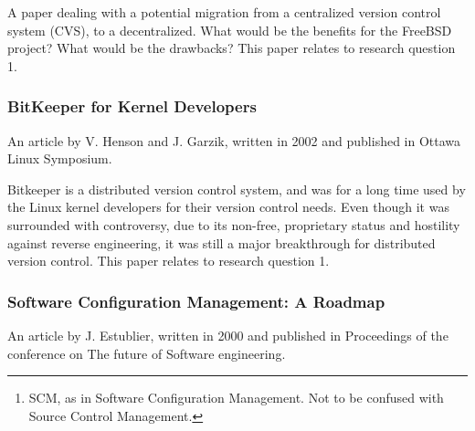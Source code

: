 \documentclass{llncs}
\begin{document}
A paper dealing with a potential migration from a centralized version
control system (CVS), to a decentralized. What would be the benefits
for the FreeBSD project? What would be the drawbacks? This paper
relates to research question 1.

\subsubsection{BitKeeper for Kernel Developers}

An article by V. Henson and J. Garzik, written in 2002 and published in
Ottawa Linux Symposium.

\begin{abstract}
 BitKeeper is a revolutionary new distributed source control management
 suite which is ideal for Linux kernel development. BitKeeper provides tools
 which automate and simplify many common kernel development tasks. In this
 paper, we describe basic BitKeeper concepts and operations, BitKeeper
 solutions for common kernel development problems, and a workflow for
 interacting with other Linux developers using BitKeeper. We also discuss
 some of BitKeeper's shortcomings and what is being done to correct them. We
 conclude that BitKeeper can dramatically imrpove the efficiency of Linux
 kernel developers.
\end{abstract}

Bitkeeper is a distributed version control system, and was for a long
time used by the Linux kernel developers for their version control
needs. Even though it was surrounded with controversy, due to its
non-free, proprietary status and hostility against reverse
engineering, it was still a major breakthrough for distributed version
control. This paper relates to research question 1.

\subsubsection{Software Configuration Management: A Roadmap}

An article by J. Estublier, written in 2000 and published in Proceedings of
the conference on The future of Software engineering.

\begin{abstract}
 This paper, in the first chapter summarizes the state of the art in
 SCM\footnote{
  SCM, as in Software Configuration Management. Not to be confused with
  Source Control Management.
 }, showing the evolution along the last 25 years. Chapter 2 shows the
 current research work under way in the area. In chapter 3, the challenges
 SCM has to take up, as well as SCM future research are discussed.
\end{abstract}
\end{document}
